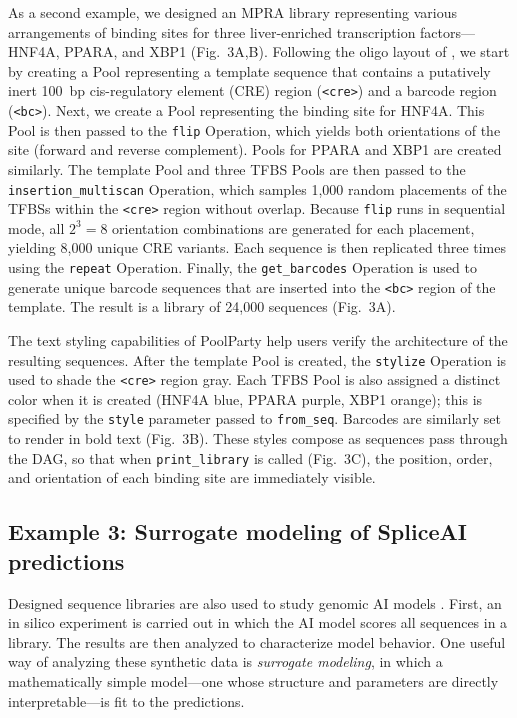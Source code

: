 \documentclass[pdflatex,sn-vancouver-num,referee,oneside]{sn-jnl}
\begin{document}
As a second example, we designed an MPRA library representing various arrangements of binding sites for three liver-enriched transcription factors---HNF4A, PPARA, and XBP1 (Fig.~3A,B). Following the oligo layout of \citet{Melnikov2012dw}, we start by creating a Pool representing a template sequence that contains a putatively inert 100~bp cis-regulatory element (CRE) region (\texttt{<cre>}) and a barcode region (\texttt{<bc>}). Next, we create a Pool representing the binding site for HNF4A. This Pool is then passed to the \texttt{flip} Operation, which yields both orientations of the site (forward and reverse complement). Pools for PPARA and XBP1 are created similarly. The template Pool and three TFBS Pools are then passed to the \texttt{insertion\_multiscan} Operation, which samples 1,000 random placements of the TFBSs within the \texttt{<cre>} region without overlap. Because \texttt{flip} runs in sequential mode, all $2^3 = 8$ orientation combinations are generated for each placement, yielding 8,000 unique CRE variants. Each sequence is then replicated three times using the \texttt{repeat} Operation. Finally, the \texttt{get\_barcodes} Operation is used to generate unique barcode sequences that are inserted into the \texttt{<bc>} region of the template. The result is a library of 24,000 sequences (Fig.~3A).

The text styling capabilities of PoolParty help users verify the architecture of the resulting sequences. After the template Pool is created, the \texttt{stylize} Operation is used to shade the \texttt{<cre>} region gray. Each TFBS Pool is also assigned a distinct color when it is created (HNF4A blue, PPARA purple, XBP1 orange); this is specified by the \texttt{style} parameter passed to \texttt{from\_seq}. Barcodes are similarly set to render in bold text (Fig.~3B). These styles compose as sequences pass through the DAG, so that when \texttt{print\_library} is called (Fig.~3C), the position, order, and orientation of each binding site are immediately visible.

\subsection*{Example 3: Surrogate modeling of SpliceAI predictions}\label{subsec:example3-spliceai}

Designed sequence libraries are also used to study genomic AI models \citep{Avsec2021bpnet, Toneyan2024creme, Seitz2024squid, Nagai2026review}. First, an in silico experiment is carried out in which the AI model scores all sequences in a library. The results are then analyzed to characterize model behavior. One useful way of analyzing these synthetic data is \emph{surrogate modeling}, in which a mathematically simple model---one whose structure and parameters are directly interpretable---is fit to the predictions.
\end{document}
